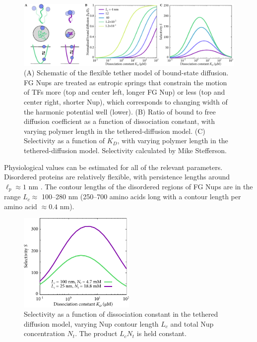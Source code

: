 \begin{figure}
\centering
\includegraphics[width=\textwidth]{figs/ch02/fig3.pdf}
\caption{(A) Schematic of the flexible tether model of bound-state
  diffusion. FG Nups are treated as entropic springs that constrain
  the motion of TFs more (top and center left, longer FG Nup) or less
  (top and center right, shorter Nup), which corresponds to changing
  width of the harmonic potential well (lower).  (B) Ratio of bound to
  free diffusion coefficient as a function of dissociation constant,
  with varying polymer length in the tethered-diffusion model.  (C)
  Selectivity as a function of $K_D$, with varying polymer length in
  the tethered-diffusion model.  Selectivity calculated by Mike Stefferson.}
\label{fig:tethers}
\end{figure}

Physiological values can be estimated for all of the relevant parameters.  Disordered proteins are relatively flexible, with persistence lengths around $\ell_p \approx 1$ nm \cite{receveur-brechot12}.  The contour lengths of the disordered regions of FG Nups are in the range $L_c\approx$ 100--280 nm (250--700 amino acids long \cite{patel07} with a contour length per amino acid $\approx 0.4$ nm).

\begin{figure}
\centering
\includegraphics[width=0.5\textwidth]{figs/ch02/chain-comparison.pdf}
\caption{Selectivity as a function of dissociation
  constant in the tethered diffusion model, varying Nup contour length $L_c$ and total Nup concentration $N_t$.  The product $L_cN_t$ is held constant.\\}
\label{fig:chainComparison}
\end{figure}

